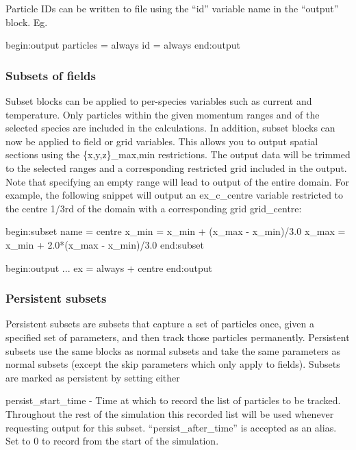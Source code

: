 Particle IDs can be written to file using the ``id'' variable name in
the ``output'' block.  Eg.
\begin{boxverbatim}
begin:output
   particles = always
   id = always
end:output
\end{boxverbatim}


\subsubsection{Subsets of fields}

Subset blocks can be applied to per-species variables such as current and
temperature. Only particles within the given momentum ranges and of the selected
species are included in the calculations. In addition, subset blocks can now
be applied to field or grid variables. This allows
you to output spatial sections using the {\emphtext \{x,y,z\}\_max,min}
restrictions.
The output data will be trimmed to the selected ranges and a corresponding
restricted grid included in the output. Note that specifying an empty range
will lead to output of the entire domain. For example, the following snippet
will output an ex\_c\_centre variable restricted to the centre 1/3rd of the
domain with a corresponding grid grid\_centre:

\begin{boxverbatim}
begin:subset
   name = centre
   x_min = x_min + (x_max - x_min)/3.0
   x_max = x_min + 2.0*(x_max - x_min)/3.0
end:subset

begin:output
   ...
   ex = always + centre
end:output
\end{boxverbatim}

\subsubsection{Persistent subsets}
\label{sec:persistent_subsets}
Persistent subsets are subsets that capture a set of particles once, given a
specified set of parameters, and then track those particles permanently.
Persistent subsets use the same blocks as normal subsets and take the same
parameters as normal subsets (except the skip parameters which only apply to
fields). Subsets are marked as persistent by setting either

{\emphtext persist\_start\_time} - Time at which to record the list of
  particles to be tracked. Throughout the rest of the simulation this recorded
  list will be used whenever requesting output for this subset.
  ``persist\_after\_time'' is accepted as an alias. Set to 0 to record from the
  start of the simulation.\\

